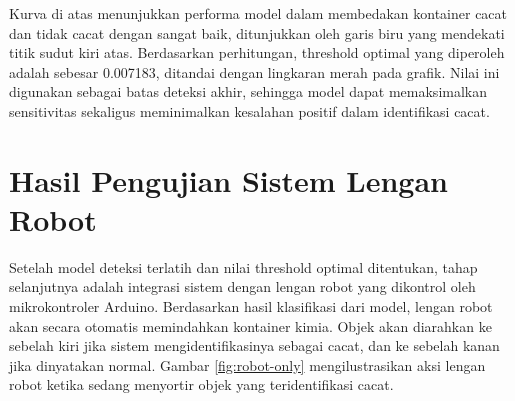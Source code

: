 Kurva di atas menunjukkan performa model dalam membedakan kontainer
cacat dan tidak cacat dengan sangat baik, ditunjukkan oleh garis biru
yang mendekati titik sudut kiri atas. Berdasarkan perhitungan,
threshold optimal yang diperoleh adalah sebesar 0.007183, ditandai
dengan lingkaran merah pada grafik. Nilai ini digunakan sebagai batas
deteksi akhir, sehingga model dapat memaksimalkan sensitivitas
sekaligus meminimalkan kesalahan positif dalam identifikasi cacat.

\vspace{1em}

\section{Hasil Pengujian Sistem Lengan Robot}

Setelah model deteksi terlatih dan nilai threshold optimal
ditentukan, tahap selanjutnya adalah integrasi sistem dengan lengan
robot yang dikontrol oleh mikrokontroler Arduino. Berdasarkan hasil
klasifikasi dari model, lengan robot akan secara otomatis memindahkan
kontainer kimia. Objek akan diarahkan ke sebelah kiri jika sistem
mengidentifikasinya sebagai cacat, dan ke sebelah kanan jika
dinyatakan normal. Gambar \ref{fig:robot-only} mengilustrasikan aksi lengan
robot ketika sedang menyortir objek yang teridentifikasi cacat.


